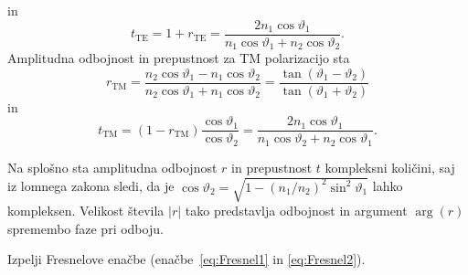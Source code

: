 in
\begin{equation}
t_{\mathrm{TE}}=1+r_{\mathrm{TE}}=\frac{2n_{1}\cos\vartheta_{1}}{n_{1}\cos\vartheta_{1}+
n_{2}\cos\vartheta_{2}}.
\end{equation}
Amplitudna odbojnost in prepustnost za TM polarizacijo sta
\begin{equation}
r_{\mathrm{TM}}=\frac{n_{2}\cos\vartheta_{1}-n_{1}\cos\vartheta_{2}}{n_{2}\cos\vartheta_{1}+n_{1}\cos\vartheta_{2}} = \frac{\tan(\vartheta_1-\vartheta_2)}{\tan(\vartheta_1+\vartheta_2)}
\label{eq:Fresnel2}
\end{equation}
in
\begin{equation}
t_{\mathrm{TM}}=(1-r_{\mathrm{TM}})\frac{\cos\vartheta_{1}}{\cos\vartheta_{2}}=
\frac{2n_{1}\cos\vartheta_{1}}
{n_{1}\cos\vartheta_{2}+n_{2}\cos\vartheta_{1}}.
\end{equation}

Na splošno sta amplitudna odbojnost $r$ in prepustnost $t$ kompleksni
količini, saj iz lomnega zakona sledi, da je $\cos\vartheta_{2}=
\sqrt{1-\left(n_{1}/n_{2}\right)^{2}\sin^{2}\vartheta_{1}}$
lahko kompleksen. Velikost števila $\left|r\right|$ tako predstavlja
odbojnost in argument $\arg(r)$ spremembo faze
pri odboju.

\begin{naloga}
Izpelji Fresnelove enačbe (enačbe~\ref{eq:Fresnel1} in \ref{eq:Fresnel2}).
\end{naloga}

